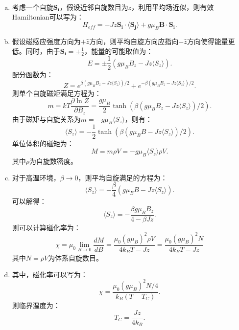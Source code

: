 \documentclass[reqno,a4paper,12pt]{amsart}
\begin{document}
\begin{enumerate}[1.]
\begin{tcolorbox}[breakable, colframe = black, colback = black!5!white]
\begin{enumerate}[(a)]
\item 考虑一个自旋$\mathbf{S_i}$，假设近邻自旋数目为$z$，利用平均场近似，则有效Hamiltonian可以写为：
\[
	H_{eff} = -Jz\mathbf{S_i} \cdot \langle \mathbf{S_j} \rangle + g\mu_B \mathbf{B} \cdot \mathbf{S_i}.
\]

\item 假设磁感应强度方向为$+\hat{z}$方向，则平均自旋方向应指向$-\hat{z}$方向使得能量更低。同时，由于$\mathbf{S_i} = \pm \frac{1}{2}$，能量的可能取值为：
\[
	E = \pm \frac{1}{2}\left( g\mu_BB_z - Jz\langle S_z \rangle \right).
\]
配分函数为：
\[
	Z = e^{\beta(g\mu_BB_z - Jz\langle S_z \rangle)/2} + e^{-\beta(g\mu_BB_z - Jz\langle S_z \rangle)/2}.
\]
则单个自旋磁矩满足方程为：
\[
	m = kT \frac{\partial \ln Z}{\partial B_z} = \frac{g\mu_B}{2} \tanh(\beta(g\mu_BB_z - Jz\langle S_z \rangle)/2).
\]
由于磁矩与自旋关系为$m = -g\mu_B\langle S_z \rangle$，则有：
\[
	\langle S_z \rangle = -\frac{1}{2} \tanh(\beta(g\mu_BB - Jz \langle S_z \rangle)/2).
\]
单位体积的磁矩为：
\[
	M = m\rho V = -g\mu_B \langle S_z \rangle \rho V.
\]
其中$\rho$为自旋数密度。

\item 对于高温环境，$\beta\to0$，则平均自旋满足的方程为：
\[
	\langle S_z \rangle = -\frac{\beta}{4}(g\mu_BB - Jz \langle S_z \rangle).
\]
可以解得：
\[
	\langle S_z \rangle = -\frac{\beta g\mu_BB_z}{4-\beta Jz}.
\]
则可以计算磁化率为：
\[
	\chi = \mu_0 \lim_{B \to 0} \frac{dM}{dB} = \frac{\mu_0 (g\mu_B)^2 \rho V}{4k_BT - Jz} = \frac{\mu_0 (g\mu_B)^2 N}{4k_BT - Jz}
\]
其中$N = \rho V$为体系自旋数目。

\item 其中，磁化率可以写为：
\[
	\chi = \frac{\mu_0(g\mu_B)^2N/4}{k_B(T-T_C)}.
\]
则临界温度为：
\[
	T_C = \frac{Jz}{4k_B}.
\]


\end{enumerate}
\end{tcolorbox}
\end{enumerate}
\end{document}
